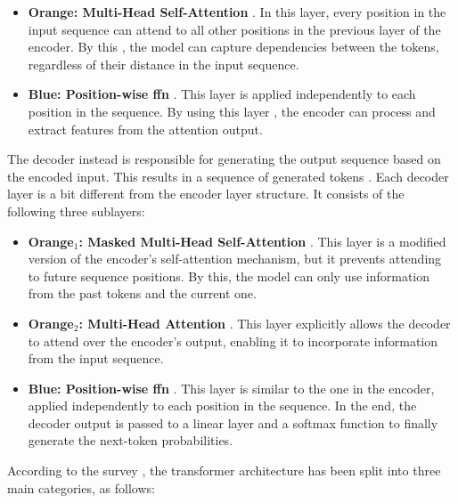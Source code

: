 \begin{itemize}
    \item \textbf{Orange: Multi-Head Self-Attention} \cite{vaswani_attention_2017}. In this layer, every position in the input sequence can attend to all other positions in the previous layer of the encoder. By this \cite{patil_review_2024}, the model can capture dependencies between the tokens, regardless of their distance in the input sequence. 
    \item \textbf{Blue: Position-wise \ac{ffn}} \cite{vaswani_attention_2017}. This layer is applied independently to each position in the sequence. By using this layer \cite{liu_understanding_2024}, the encoder can process and extract features from the attention output.
\end{itemize}

 The decoder instead is responsible for generating the output sequence based on the encoded input. This results in a sequence of generated tokens \cite{raiaan_review_2024}. Each decoder layer is a bit different from the encoder layer structure. It consists of the following three sublayers:

\begin{itemize}
    \item \textbf{Orange$_1$: Masked Multi-Head Self-Attention} \cite{vaswani_attention_2017}. This layer is a modified version of the encoder's self-attention mechanism, but it prevents attending to future sequence positions. By this, the model can only use information from the past tokens and the current one.
    \item \textbf{Orange$_2$: Multi-Head Attention} \cite{vaswani_attention_2017}. This layer explicitly allows the decoder to attend over the encoder's output, enabling it to incorporate information from the input sequence.
    \item \textbf{Blue: Position-wise \ac{ffn}} \cite{vaswani_attention_2017}. This layer is similar to the one in the encoder, applied independently to each position in the sequence. In the end, the decoder output is passed to a linear layer and a softmax function to finally generate the next-token probabilities.
\end{itemize}

\pagebreak

 According to the survey \cite{shao_survey_2024}, the transformer architecture has been split into three main categories, as follows:

